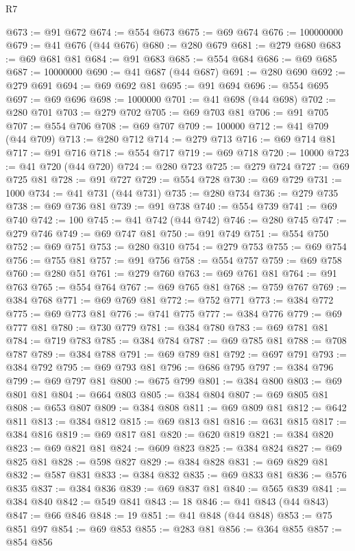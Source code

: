 \begin{lexlean}{R7}
\begin{coremodule}
@673 := @91 @672
@674 := @554 @673
@675 := @69 @674
@676 := 100000000
@679 := @41 @676 (@44 @676)
@680 := @280 @679
@681 := @279 @680
@683 := @69 @681 @81
@684 := @91 @683
@685 := @554 @684
@686 := @69 @685
@687 := 10000000
@690 := @41 @687 (@44 @687)
@691 := @280 @690
@692 := @279 @691
@694 := @69 @692 @81
@695 := @91 @694
@696 := @554 @695
@697 := @69 @696
@698 := 1000000
@701 := @41 @698 (@44 @698)
@702 := @280 @701
@703 := @279 @702
@705 := @69 @703 @81
@706 := @91 @705
@707 := @554 @706
@708 := @69 @707
@709 := 100000
@712 := @41 @709 (@44 @709)
@713 := @280 @712
@714 := @279 @713
@716 := @69 @714 @81
@717 := @91 @716
@718 := @554 @717
@719 := @69 @718
@720 := 10000
@723 := @41 @720 (@44 @720)
@724 := @280 @723
@725 := @279 @724
@727 := @69 @725 @81
@728 := @91 @727
@729 := @554 @728
@730 := @69 @729
@731 := 1000
@734 := @41 @731 (@44 @731)
@735 := @280 @734
@736 := @279 @735
@738 := @69 @736 @81
@739 := @91 @738
@740 := @554 @739
@741 := @69 @740
@742 := 100
@745 := @41 @742 (@44 @742)
@746 := @280 @745
@747 := @279 @746
@749 := @69 @747 @81
@750 := @91 @749
@751 := @554 @750
@752 := @69 @751
@753 := @280 @310
@754 := @279 @753
@755 := @69 @754
@756 := @755 @81
@757 := @91 @756
@758 := @554 @757
@759 := @69 @758
@760 := @280 @51
@761 := @279 @760
@763 := @69 @761 @81
@764 := @91 @763
@765 := @554 @764
@767 := @69 @765 @81
@768 := @759 @767
@769 := @384 @768
@771 := @69 @769 @81
@772 := @752 @771
@773 := @384 @772
@775 := @69 @773 @81
@776 := @741 @775
@777 := @384 @776
@779 := @69 @777 @81
@780 := @730 @779
@781 := @384 @780
@783 := @69 @781 @81
@784 := @719 @783
@785 := @384 @784
@787 := @69 @785 @81
@788 := @708 @787
@789 := @384 @788
@791 := @69 @789 @81
@792 := @697 @791
@793 := @384 @792
@795 := @69 @793 @81
@796 := @686 @795
@797 := @384 @796
@799 := @69 @797 @81
@800 := @675 @799
@801 := @384 @800
@803 := @69 @801 @81
@804 := @664 @803
@805 := @384 @804
@807 := @69 @805 @81
@808 := @653 @807
@809 := @384 @808
@811 := @69 @809 @81
@812 := @642 @811
@813 := @384 @812
@815 := @69 @813 @81
@816 := @631 @815
@817 := @384 @816
@819 := @69 @817 @81
@820 := @620 @819
@821 := @384 @820
@823 := @69 @821 @81
@824 := @609 @823
@825 := @384 @824
@827 := @69 @825 @81
@828 := @598 @827
@829 := @384 @828
@831 := @69 @829 @81
@832 := @587 @831
@833 := @384 @832
@835 := @69 @833 @81
@836 := @576 @835
@837 := @384 @836
@839 := @69 @837 @81
@840 := @565 @839
@841 := @384 @840
@842 := @549 @841
@843 := 18
@846 := @41 @843 (@44 @843)
@847 := @66 @846
@848 := 19
@851 := @41 @848 (@44 @848)
@853 := @75 @851 @97
@854 := @69 @853
@855 := @283 @81
@856 := @364 @855
@857 := @854 @856

\end{coremodule}
\end{lexlean}
